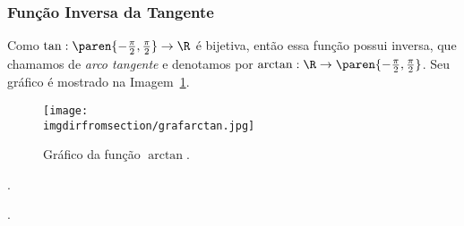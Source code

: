 \subsubsection{Função Inversa da Tangente}

\begin{example}
Como $\tan: \paren{- \frac {\pi} 2, \frac {\pi} 2} \to \R$ é
bijetiva, então essa função possui inversa, que chamamos de
\emph{arco tangente} e denotamos por $\arctan : \R \to
\paren{- \frac {\pi} 2, \frac {\pi} 2}$. Seu gráfico é mostrado na Imagem~\ref{img:grafico-arctan}.
%
\begin{figure}[H]
\centering
\texttt{[image: \\imgdirfromsection/grafarctan.jpg]}
\caption{Gráfico da função $\arctan$.}
\label{img:grafico-arctan}
\end{figure}
\end{example}

\begin{onlineact}
	.
\end{onlineact}

\begin{onlineact}
	.
\end{onlineact}